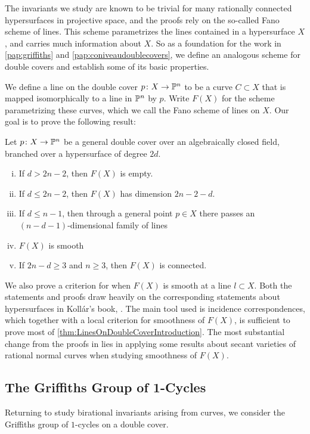 The invariants we study are known to be trivial for many rationally connected  hypersurfaces in projective space, and the proofs rely on the so-called Fano scheme of lines. This scheme parametrizes the lines contained in a hypersurface $X$, and carries much information about $X$. So as a foundation for the work in \cref{pap:griffiths} and \cref{pap:coniveaudoublecovers}, we define an analogous scheme for double covers and establish some of its basic properties.

We define a line on the double cover $p \from X \to \P^n$ to be a curve $C \subset X$ that is mapped isomorphically to a line in $\P^n$ by $p$. Write $F(X)$ for the scheme parametrizing these curves, which we call the Fano scheme of lines on $X$. Our goal is to prove the following result:
\begin{theorem}
	\label{thm:LinesOnDoubleCoverIntroduction}
	Let $p \from X \to \P^n$ be a general double cover over an algebraically closed field, branched over a hypersurface of degree $2d$.
	\begin{enumerate}[i)]
		\item If $d > 2n - 2$, then $F(X)$ is empty.
		\item If $d \leq 2n - 2$, then $F(X)$ has dimension $2n-2-d$.
		\item If $d \leq n-1$, then through a general point $p \in X$ there passes an $(n-d-1)$-dimensional family of lines
		\item $F(X)$ is smooth
		\item If $2n-d \geq 3$ and $n \geq 3$, then $F(X)$ is connected.
	\end{enumerate}
\end{theorem}
We also prove a criterion for when $F(X)$ is smooth at a line $l \subset X$. Both the statements and proofs draw heavily on the corresponding statements about hypersurfaces in Koll\'ar's book, \cite[Section V.4]{KollarRationalCurves}. The main tool used is incidence correspondences, which together with a local criterion for smoothness of $F(X)$, is sufficient to prove most of \cref{thm:LinesOnDoubleCoverIntroduction}. The most substantial change from the proofs in \cite[Section V.4]{KollarRationalCurves} lies in applying some results about secant varieties of rational normal curves when studying smoothness of $F(X)$.


\subsection{The Griffiths Group of 1-Cycles}
Returning to study birational invariants arising from curves, we consider the Griffiths group of $1$-cycles on a double cover.

